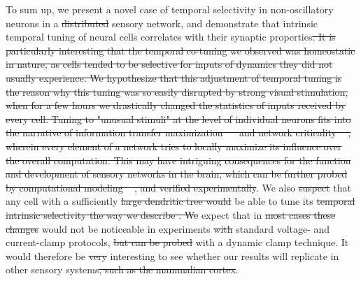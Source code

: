 \documentclass{article}
\providecommand{\DIFaddtex}[1]{{\protect\color{blue}{#1}}} %
\providecommand{\DIFdeltex}[1]{{\protect\color{red}\sout{#1}}}                      %
\providecommand{\DIFaddbegin}{} %
\providecommand{\DIFaddend}{} %
\providecommand{\DIFdelbegin}{} %
\providecommand{\DIFdelend}{} %
\providecommand{\DIFadd}[1]{\texorpdfstring{\DIFaddtex{#1}}{#1}} %
\providecommand{\DIFdel}[1]{\texorpdfstring{\DIFdeltex{#1}}{}} %
\newcommand{\DIFscaledelfig}{0.5}
\newlength{\DIFdelgraphicswidth} %
\newlength{\DIFdelgraphicsheight} %
\newcommand{\DIFaddincludegraphics}[2][]{{\color{blue}\fbox{\DIFOincludegraphics[#1]{#2}}}} %
\newcommand{\DIFdelincludegraphics}[2][]{%
\sbox{\DIFdelgraphicsbox}{\DIFOincludegraphics[#1]{#2}}%
\settoboxwidth{\DIFdelgraphicswidth}{\DIFdelgraphicsbox} %
\settoboxtotalheight{\DIFdelgraphicsheight}{\DIFdelgraphicsbox} %
\scalebox{\DIFscaledelfig}{%
\parbox[b]{\DIFdelgraphicswidth}{\usebox{\DIFdelgraphicsbox}\\[-\baselineskip] \rule{\DIFdelgraphicswidth}{0em}}\llap{\resizebox{\DIFdelgraphicswidth}{\DIFdelgraphicsheight}{%
\setlength{\unitlength}{\DIFdelgraphicswidth}%
\begin{picture}(1,1)%
\thicklines\linethickness{2pt} %
{\color[rgb]{1,0,0}\put(0,0){\framebox(1,1){}}}%
{\color[rgb]{1,0,0}\put(0,0){\line( 1,1){1}}}%
{\color[rgb]{1,0,0}\put(0,1){\line(1,-1){1}}}%
\end{picture}%
}\hspace*{3pt}}} %
} %
\DeclareRobustCommand{\DIFaddbegin}{\DIFOaddbegin \let\includegraphics\DIFaddincludegraphics} %
\DeclareRobustCommand{\DIFaddend}{\DIFOaddend \let\includegraphics\DIFOincludegraphics} %
\DeclareRobustCommand{\DIFdelbegin}{\DIFOdelbegin \let\includegraphics\DIFdelincludegraphics} %
\DeclareRobustCommand{\DIFdelend}{\DIFOaddend \let\includegraphics\DIFOincludegraphics} %
\begin{document}
To sum up, we present a novel case of temporal selectivity in non-oscillatory neurons in a \DIFdelbegin \DIFdel{distributed }\DIFdelend sensory network, and demonstrate that intrinsic temporal tuning of neural cells correlates with their synaptic properties\DIFdelbegin \DIFdel{. It is particularly interesting that the temporal co-tuning we observed was homeostatic in nature, as cells tended to be selective for inputs of dynamics they did not usually experience. We hypothesize that this adjustment of temporal tuning is the reason why this tuning was so easily disrupted by strong visual stimulation, when for a few hours we drastically changed the statistics of inputs received by every cell. Tuning to "unusual stimuli" at the level of individual neurons fits into the narrative of information transfer maximization \mbox{%
\citep{stemmler1999information,brenner2000} }\hspace{0pt}%
and network criticality \mbox{%
\citep{rubinov2011}}\hspace{0pt}%
, wherein every element of a network tries to locally maximize its influence over the overall computation. This may have intriguing consequences for the function and development of sensory networks in the brain, which can be further probed by computational modeling \mbox{%
\citep{khakhalin2014,jang2016}}\hspace{0pt}%
, and verified experimentally}\DIFdelend \DIFaddbegin \DIFadd{, and is modified by sensory experiences}\DIFaddend . We also \DIFdelbegin \DIFdel{suspect }\DIFdelend \DIFaddbegin \DIFadd{argue }\DIFaddend that any cell with a sufficiently \DIFdelbegin \DIFdel{large dendritic tree would }\DIFdelend \DIFaddbegin \DIFadd{complex morphology could }\DIFaddend be able to tune its \DIFdelbegin \DIFdel{temporal intrinsic selectivity the way we describe . We }\DIFdelend \DIFaddbegin \DIFadd{intrinsic temporal selectivity in ways we describe in this paper. Crucially, we }\DIFaddend expect that in \DIFdelbegin \DIFdel{most cases these changes }\DIFdelend \DIFaddbegin \DIFadd{many cases this tuning }\DIFaddend would not be noticeable in experiments \DIFdelbegin \DIFdel{with }\DIFdelend \DIFaddbegin \DIFadd{that use }\DIFaddend standard voltage- and current-clamp protocols, \DIFdelbegin \DIFdel{but can be probed }\DIFdelend \DIFaddbegin \DIFadd{yet can be easily uncovered }\DIFaddend with a dynamic clamp technique. It would therefore be \DIFdelbegin \DIFdel{very }\DIFdelend interesting to see whether our results will replicate in other sensory systems\DIFdelbegin \DIFdel{, such as the mammalian cortex}\DIFdelend .
\end{document}
